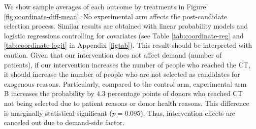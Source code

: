 \documentclass[12pt, a4paper]{article}
\begin{document}
We show sample averages of each outcome by treatments in Figure \ref{fig:coordinate-diff-mean}. No experimental arm affects the post-candidate selection process. Similar results are obtained with linear probability models and logistic regressions controlling for covariates (see Table \ref{tab:coordinate-reg} and \ref{tab:coordinate-logit} in Appendix \ref{figtab}). This result should be interpreted with caution. Given that our intervention does not affect demand (number of patients), if our intervention increases the number of people who reached the CT, it should increase the number of people who are not selected as candidates for exogenous reasons. Particularly, compared to the control arm, experimental arm B increases the probability by \(4.3\) percentage points of donors who reached CT not being selected due to patient reasons or donor health reasons. This difference is marginally statistical significant (\(p = 0.095\)). Thus, intervention effects are canceled out due to demand-side factor.
\end{document}
